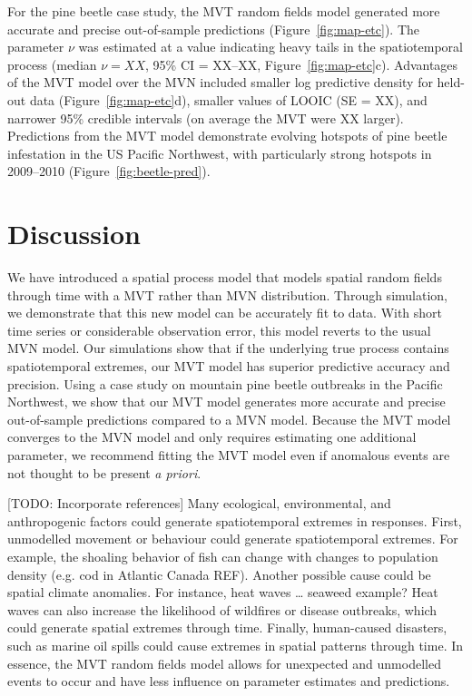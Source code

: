 \documentclass[12pt,english]{article}
\begin{document}
\begin{spacing}{1.9}
For the pine beetle case study, the MVT random fields model generated more
accurate and precise out-of-sample predictions (Figure~\ref{fig:map-etc}). The
parameter $\nu$ was estimated at a value indicating
heavy tails in the spatiotemporal process (median
$\nu = XX$, 95\% CI = XX--XX, Figure~\ref{fig:map-etc}c). Advantages of the MVT
model over the MVN included smaller log predictive density for held-out data
(Figure~\ref{fig:map-etc}d), smaller values of LOOIC (SE = XX), and narrower
95\% credible intervals (on average the MVT were XX larger). Predictions from
the MVT model demonstrate evolving hotspots of pine beetle infestation in the
US Pacific Northwest, with particularly strong hotspots in 2009--2010
(Figure~\ref{fig:beetle-pred}).

\section{Discussion}

We have introduced a spatial process model that models spatial random fields
through time with a MVT rather than MVN distribution. Through simulation, we
demonstrate that this new model can be accurately fit to data. With short time
series or considerable observation error, this model reverts to the usual MVN
model. Our simulations show that if
the underlying true process contains spatiotemporal extremes, our MVT model has
superior predictive accuracy and precision. Using a case study on mountain pine beetle
outbreaks in the Pacific
Northwest, we show that our MVT model generates more accurate and precise
out-of-sample predictions compared to a MVN model. Because the MVT model
converges to the MVN model and only requires estimating one
additional parameter, we recommend fitting the MVT model even if anomalous
events are not thought to be present \textit{a priori}.

[TODO: Incorporate references] Many ecological, environmental, and anthropogenic
factors could generate spatiotemporal extremes in responses. First, unmodelled
movement or behaviour could generate spatiotemporal
extremes. For example, the shoaling behavior of fish can change with changes to
population density (e.g. cod in Atlantic Canada REF). Another possible
cause could be spatial climate anomalies. For instance, heat waves \ldots
seaweed example? Heat waves can also increase the likelihood of wildfires or
disease outbreaks, which could generate spatial extremes through time. Finally,
human-caused disasters, such as marine oil spills could cause extremes in
spatial patterns through time. In essence, the MVT random fields model allows
for unexpected and unmodelled events to occur and have less influence on
parameter estimates and predictions.


\end{spacing}
\end{document}
